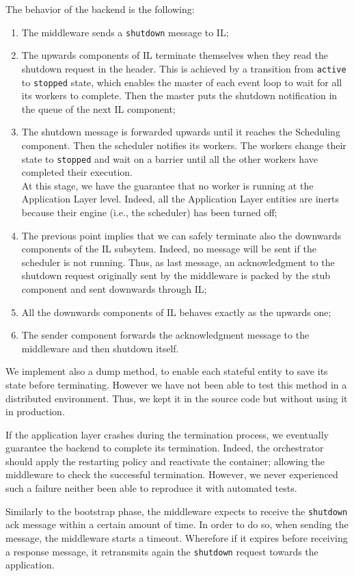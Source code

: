 The behavior of the backend is the following:


\begin{enumerate}
  \item The middleware sends a \verb|shutdown| message to IL;
  \item The upwards components of IL terminate themselves when they
  read the shutdown request in the header. This is achieved by a transition
  from \verb|active| to \verb|stopped| state, which enables the master
  of each event loop to wait for all its workers to complete. Then the master
  puts the shutdown notification in the queue of the next IL component;
  \item The shutdown message is forwarded upwards until it reaches the Scheduling
  component. Then the scheduler notifies its workers. The workers change their
  state to \verb|stopped| and wait on a barrier until all the other workers have
  completed their execution. \\
  At this stage, we have the guarantee that no worker is running at
  the Application Layer level. Indeed, all the Application Layer
  entities are inerts because their engine (i.e., the scheduler) has been
  turned off;
  \item The previous point implies that we can safely terminate
  also the downwards components of the IL subsytem. Indeed, no message
  will be sent if the scheduler is not running. Thus, as last message,
  an acknowledgment to the shutdown request
  originally sent by the middleware is packed
  by the stub component and sent downwards through IL;
  \item All the downwards components of IL behaves exactly as the upwards one;
  \item The sender component forwards the acknowledgment message
  to the middleware and then shutdown itself.
\end{enumerate}


We implement also a dump method, to enable each stateful entity to save its
state before terminating. However we have not
been able to test this method in a distributed environment. Thus, we
kept it in the source code but without using it in production.


If the application layer crashes during the termination process, we eventually
guarantee the backend to complete its termination. Indeed, the
orchestrator should apply the restarting policy and reactivate the container;
allowing the middleware to check the successful termination.
However, we never experienced
such a failure neither been able to reproduce it with automated tests.


Similarly to the bootstrap phase, the middleware expects to receive the
\verb|shutdown| ack message within a certain amount of time.
In order to do so, when sending the message, the middleware starts a timeout.
Wherefore if it expires before receiving a response message,
it retransmits again the \verb|shutdown| request towards the application.
